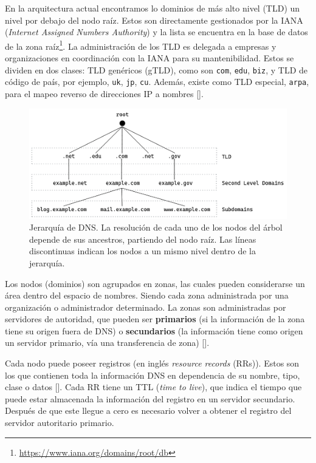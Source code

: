 En la arquitectura actual encontramos lo dominios de más alto nivel (TLD) un nivel por debajo del nodo raíz. Estos son directamente gestionados por la IANA (\textit{Internet Assigned Numbers Authority}) y la lista se encuentra en la base de datos de la zona raíz\footnote{\url{https://www.iana.org/domains/root/db}}. La administración de los TLD es delegada a empresas y organizaciones en coordinación con la IANA para su mantenibilidad. Estos se dividen en dos clases: TLD genéricos (gTLD), como son \verb|com|, \verb|edu|, \verb|biz|, y TLD de código de país, por ejemplo, \verb|uk|, \verb|jp|, \verb|cu|. Además, existe como TLD especial, \verb|arpa|, para el mapeo reverso de direcciones IP a nombres [\cite{pappas2004impact}].

\begin{figure}[!ht]
    \centering
    \includegraphics[width=\linewidth]{draws/dns-arch.png}
    \caption{Jerarquía de DNS. La resolución de cada uno de los nodos del árbol depende de sus ancestros, partiendo del nodo raíz. Las líneas discontinuas indican los nodos a un mismo nivel dentro de la jerarquía.}
\end{figure}

Los nodos (dominios) son agrupados en zonas, las cuales pueden considerarse un área dentro del espacio de nombres. Siendo cada zona administrada por una organización o administrador determinado. La zonas son administradas por servidores de autoridad, que pueden ser \textbf{primarios} (si la información de la zona tiene su origen fuera de DNS) o \textbf{secundarios} (la información tiene como origen un servidor primario, vía una transferencia de zona) [\cite{Vixie_2007}].

Cada nodo puede poseer registros (en inglés \textit{resource records} (RRs)). Estos son los que contienen toda la información DNS en dependencia de su nombre, tipo, clase o datos [\cite{rfc_1035}]. Cada RR tiene un TTL (\textit{time to live}), que indica el tiempo que puede estar almacenada la información del registro en un servidor secundario. Después de que este llegue a cero es necesario volver a obtener el registro del servidor autoritario primario.

